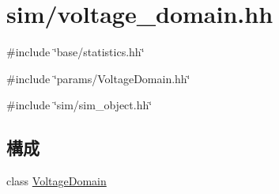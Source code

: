 \hypertarget{voltage__domain_8hh}{
\section{sim/voltage\_\-domain.hh}
\label{voltage__domain_8hh}
}
{\ttfamily \#include \char`\"{}base/statistics.hh\char`\"{}}\par
{\ttfamily \#include \char`\"{}params/VoltageDomain.hh\char`\"{}}\par
{\ttfamily \#include \char`\"{}sim/sim\_\-object.hh\char`\"{}}\par
\subsection*{構成}
\begin{DoxyCompactItemize}
\item 
class \hyperlink{classVoltageDomain}{VoltageDomain}
\end{DoxyCompactItemize}
